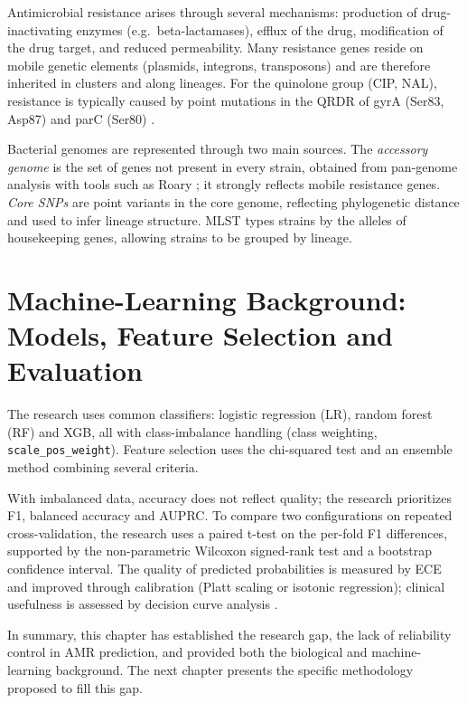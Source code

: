 \documentclass[../main.tex]{subfiles}
\begin{document}
Antimicrobial resistance arises through several mechanisms: production of drug-inactivating enzymes (e.g.\ beta-lactamases), efflux of the drug, modification of the drug target, and reduced permeability. Many resistance genes reside on mobile genetic elements (plasmids, integrons, transposons) and are therefore inherited in clusters and along lineages. For the quinolone group (CIP, NAL), resistance is typically caused by point mutations in the QRDR of gyrA (Ser83, Asp87) and parC (Ser80) \cite{redgrave2014fluoroquinolone}.

Bacterial genomes are represented through two main sources. The \textit{accessory genome} is the set of genes not present in every strain, obtained from pan-genome analysis with tools such as Roary \cite{page2015roary}; it strongly reflects mobile resistance genes. \textit{Core SNPs} are point variants in the core genome, reflecting phylogenetic distance and used to infer lineage structure. \gls{MLST} \cite{maiden1998mlst} types strains by the alleles of housekeeping genes, allowing strains to be grouped by lineage.

\section{Machine-Learning Background: Models, Feature Selection and Evaluation}

The research uses common classifiers: logistic regression (\gls{LR}), random forest (\gls{RF}) \cite{pedregosa2011scikit} and \gls{XGB}, all with class-imbalance handling (class weighting, \texttt{scale\_pos\_weight}). Feature selection uses the chi-squared test and an ensemble method combining several criteria.

With imbalanced data, accuracy does not reflect quality; the research prioritizes F1, balanced accuracy and \gls{AUPRC}. To compare two configurations on repeated cross-validation, the research uses a paired t-test on the per-fold F1 differences, supported by the non-parametric Wilcoxon signed-rank test and a bootstrap confidence interval. The quality of predicted probabilities is measured by \gls{ECE} and improved through calibration (Platt scaling or isotonic regression); clinical usefulness is assessed by decision curve analysis \cite{vickers2006decision}.

In summary, this chapter has established the research gap, the lack of reliability control in AMR prediction, and provided both the biological and machine-learning background. The next chapter presents the specific methodology proposed to fill this gap.
\end{document}
